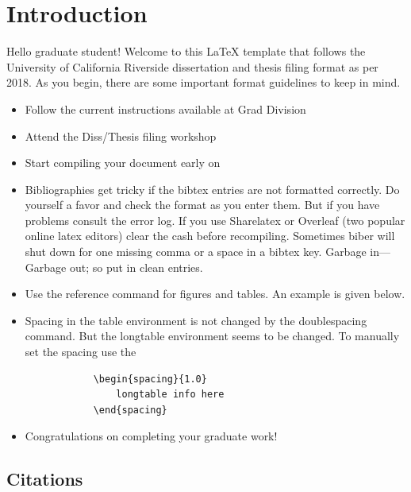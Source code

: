 \section{Introduction}

Hello graduate student! Welcome to this \LaTeX{} template that follows the University of California Riverside dissertation and thesis filing format as per 2018. As you begin, there are some important format guidelines to keep in mind.
    \begin{itemize}
        \item Follow the current instructions available at Grad Division
        \item Attend the Diss/Thesis filing workshop
        \item Start compiling your document early on
        \item Bibliographies get tricky if the bibtex entries are not formatted correctly. Do yourself a favor and check the format as you enter them. But if you have problems consult the error log. If you use Sharelatex or Overleaf (two popular online latex editors) clear the cash before recompiling. Sometimes biber will shut down for one missing comma or a space in a bibtex key. Garbage in---Garbage out; so put in clean entries.
        \item Use the reference command for figures and tables. An example is given below.
        \item Spacing in the table environment is not changed by the doublespacing command. But the longtable environment seems to be changed. To manually set the spacing use the \begin{verbatim}
            \begin{spacing}{1.0}
                longtable info here
            \end{spacing}
        \end{verbatim}
        \item Congratulations on completing your graduate work!
    \end{itemize}
    
\subsection{Citations}

